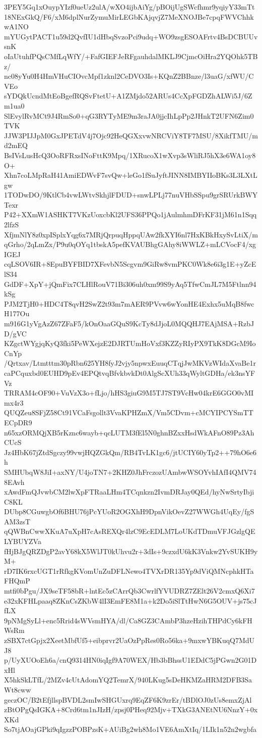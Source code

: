 3PEY5Gq1xOuypYIzf0ueUz2ulA/wXO4ijbAiYg/pBOijUgSWcfhmr9yqiyY33mTt
18NExGkQ/F6/xM6dplNurZymuMirLEGbKAjqvjZ7MeXNOJBe7cpqFWVChhkwA1NO
mYUGytPACT1u59d2QvfIU1dHbqSvzoPci9udq+WO9zsgESOAFrtv4BsDCBUUvsnK
oIaUtuhfPQsCMfLqWfY/+FafGIEFJeRFgauhdalMKLJ9CjmcOiHra2YQOhk5TBz/
nc08yYu0H4HmVHuCIOvcMpf1zknl2CeDVO3Is+KQnZ2BBnze/l3uaG/xfWU/CVEo
sYDQkUcndMtEoBgefRQSvFtetU+A1ZMjdo52ARUs4CcXpFGDZhALWi5J/6Zm1ua0
SlEvylRvMCt9J4RmSo0+qG3RYTyME9m3raJA0jjcIhLpPp2JHnkT2UFN6Zim0TVK
JJW3PIJJpM0GxJPETdV4j7Ojc92HeQGXxvwNRCViY8TF7MSU/8XikfTMU/md2mEQ
BsIVsLusHcQ3OoRFRxsINoFttK9Mpq/1XRucoX1wXvp3sWliRJ5hX3e6WA1oy8O+
Xhn7coLMpRaH41AmiEDWvF7svQw+leGo1fSuJyftJINN8IMBYIIoBKs3L3LXtLgw
1TODwDO/9KtlCb4vwLWtvSkhjlFDUD+snwLPLj77nuVHbSSpu9grSRUrkBWYTexr
P42+XXmW1ASHKT7VKzUoxcbKl2UFS36PPQo1jAulmhmDFrKF31jM61n1Sqq2lfzS
XfjmNlY8z0xpISplxYqg6x7MRjQrpuqHppqUAw2fkXYI6nl7HxKBkHxySvLtiX/m
qGrho/2qLmZx/P9u0qOYq1tbskA5pefKVAUBhgGAhy8iWWLZ+mLCVocF4/xgIGEJ
cqLSOV6IR+8EpuBYFBID7XFevbN5Scgvm9GiRw8vmPKC0Wk8e6i3g1E+yZcElS34
GdDF+XpY+jQmFix7CLHlRouV71Bi306uh0xm99S9yAq5TfwCmJL7M5Ftlnn94kSg
PJM2TjH0+HDC4T8qvH2SwZ2t93m7mAER9PVvw6wYonHE4Exhx5uMqB8fwcH177Ou
m916G1yVgAzZ67ZFaF5/kOnOaaGQuS9KcTy8dJjoL0MQQHJ7EAjMSA+RzbJD/gVC
KZgctWYgjqKyQ3fki5PeWXejzE2DJRTUmHoVxf3KZZyRIyPX9TkK8DGcM9IoCnYp
/Qrtxav/Ltmtttm30pRbn625YH8fyJ2vjy5npwxEuuqCTqjJwMKVzWIdaXvaBe1r
caPCquxbd0EUHD9pEv4EPQtvqBfvkbvkDt0AlgScXUh33qWyltGDHa/ek3nsYFVz
TRRAM4cOF90+VuVzX3o+fLjo/hHS3giuG9M5TJ7ST9VcHw04krE6GGO0vMImx4r3
QUQZeu8SFjZ58Ct91VCaFsgollt3VvaKPHZmX/Vm5CDvm+cMCYIPCYSmTTECpDR9
n65xzORMQjXB5rKznc6wayb+qcLUTM3fEl5N0ghnBZxxHsdWkAFnO89Pz3AhCUcS
Jz4HbK67jZtdSgczy99vwjHQZGkQm/RB4TvLK1gc6/jtUCIY60yTp2++79hO6e6h
SMHUbqW8JiI+axNY/U4joTN7+2KHZ0JhFrczozUAmbwWSOYvhIAfI4QMV748EAvh
xAwdFmQJvwbCM2lwXpFTRaaLHm4TCqnkzn2IvmDRJay0QEd/hyNwSrtyIbjiC8KL
DUbp8CGuwgbOf6BHU76jPcYUoR2OGXhH9DpnVikOevZ27WWGh4UqEy/fgSAM3zsT
qQWBnCwwXKuA7uXpH7cAsREXQr4lzC9EcEDLM7LoUKdTDmuVFJGzlgQELYBUYZVa
fHjBJgQRZDgP2avY68kX5WlJT0kUhvu2r+3dIs+9czxdU6kK3Vnkw2YvSUKH9yM+
rD7IK6rxcUGT1rRfkgKVomUnZuDFLNewo4TVXrDR135Yp9dViQMNcphkHTaFHQmP
mtfi0bPgu/JX9seTF58bR+lntEc5zCArrQb3CwrlfYVUDRZ7ZElt26V2cmxQ6Xi7
e32xKFHLpaaq8ZKnCsZKbW4lI3EmFE8M1a+k2Do5iSlTtHwN6G5OUV+js75cJfLX
9pNMgSyLl+enc5Rrid4sWVsmHYA/dl/Ca8GZ3CAmbP3hzeHzihTHPdCy6kFHWsRm
zSBX7ctGpjx2XeetMbfUf5+eibprvr2UaOzPpRes0Ro56ka+9mxwYBKuqQ7MdUJ8
p/UyXUOoEh6a/cnQ9314HN0iqIgf9A70WEX/Hb3bBhssU1EDdC5jPGwn2G01DxHl
X5hkSkLTfL/2MZv4cUtAdomYQ2TemrX/940LKug5sDeHKMZaHRM2DFB3SaWt8cww
geczOC/B2tEfjllspBVDL2smIwSHGUxrq9EqZF6K9zrEr/tBDlOJ0zUs8emxZjAl
zBtOPgQsIGKA+8Crd6tm1nJIzH/zpsj0PHeq92Mjv+TXkG3ANEtNU6NnzY+0xXKd
So7tjAOajGPki9qIgzzPOBPzsK+AUiBg2wh8Mo1VE6AmXtIq/1LIk1n52n2wgbfa
